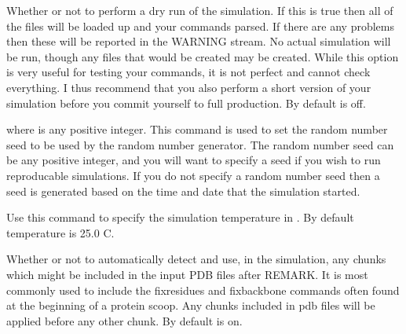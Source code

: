 \documentclass[letterpaper,10pt,english]{sphinxmanual}
\begin{document}
Whether or not to perform a dry run of the simulation. If this is true then all of the files will be loaded up and your commands parsed. If there are any problems then these will be reported in the WARNING stream. No actual simulation will be run, though any files that would be created may be created. While this option is very useful for testing your commands, it is not perfect and cannot check everything. I thus recommend that you also perform a short version of your simulation before you commit yourself to full production. By default  is off.

\ignorespaces 
\def\sphinxLiteralBlockLabel{\label{\detokenize{protoms:index-32}}}
%
\begin{sphinxVerbatim}[commandchars=\\\{\}]
 
\end{sphinxVerbatim}

where  is any positive integer. This command is used to set the random number seed to be used by the random number generator. The random number seed can be any positive integer, and you will want to specify a seed if you wish to run reproducable simulations. If you do not specify a random number seed then a seed is generated based on the time and date that the simulation started.

\ignorespaces 
\def\sphinxLiteralBlockLabel{\label{\detokenize{protoms:index-33}}}
%
\begin{sphinxVerbatim}[commandchars=\\\{\}]
 
\end{sphinxVerbatim}

Use this command to specify the simulation temperature in . By default temperature is 25.0 C.

\ignorespaces 
\def\sphinxLiteralBlockLabel{\label{\detokenize{protoms:index-34}}}
%
\begin{sphinxVerbatim}[commandchars=\\\{\}]
 
\end{sphinxVerbatim}

Whether or not to automatically detect and use, in the simulation, any chunks which might be included in the input PDB files after REMARK. It is most commonly used to include the fixresidues and fixbackbone commands often found at the beginning of a protein scoop. Any chunks included in pdb files will be applied before any other chunk. By default  is on.
\end{document}
